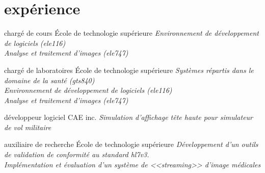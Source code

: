 \documentclass[]{friggeri-cv}
\newif\ifenglish
\begin{document}
\ifenglish\section{experience}\else\section{expérience}\fi

\begin{entrylist}
  \ifenglish
    \entry {2009-2014} {chargé de cours} {École de technologie supérieure} {\emph{Environnement de développement de logiciels (ele{\footnotesize116})\\Analyse et traitement d'images (ele{\footnotesize747})}}
  \else
     {chargé de cours} {École de technologie supérieure} {\emph{Environnement de développement de logiciels (ele{\footnotesize116})\\Analyse et traitement d'images (ele{\footnotesize747})}}
  \fi

  \ifenglish
    \entry {2009-2014} {chargé de laboratoires} {École de technologie supérieure} {\emph{Systèmes répartis dans le domaine de la santé (gts{\footnotesize840})\\Environnement de développement de logiciels (ele{\footnotesize116})\\Analyse et traitement d'images (ele{\footnotesize747})}}
  \else
     {chargé de laboratoires} {École de technologie supérieure} {\emph{Systèmes répartis dans le domaine de la santé (gts{\footnotesize840})\\Environnement de développement de logiciels (ele{\footnotesize116})\\Analyse et traitement d'images (ele{\footnotesize747})}}
  \fi

  \ifenglish
    \entry {2009} {développeur logiciel} {CAE inc.} {\emph{Simulation d'affichage tête haute pour simulateur de vol militaire}}
  \else
     {développeur logiciel} {CAE inc.} {\emph{Simulation d'affichage tête haute pour simulateur de vol militaire}}
  \fi

  \ifenglish
    \entry {2006-2008} {auxiliaire de recherche} {École de technologie supérieure} {\emph{Développement d'un outils de validation de conformité au standard hl{\small7}v{\small3}.\\Implémentation et évaluation d'un système de <<streaming>> d'image médicales}}
  \else
     {auxiliaire de recherche} {École de technologie supérieure} {\emph{Développement d'un outils de validation de conformité au standard hl{\small7}v{\small3}.\\Implémentation et évaluation d'un système de <<streaming>> d'image médicales}}
  \fi
\end{entrylist}
\end{document}
